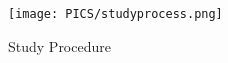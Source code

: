 







\begin{figure}
    \centering
    \texttt{[image: PICS/studyprocess.png]}
    \caption{Study Procedure}
    \label{fig: study design}
\end{figure}